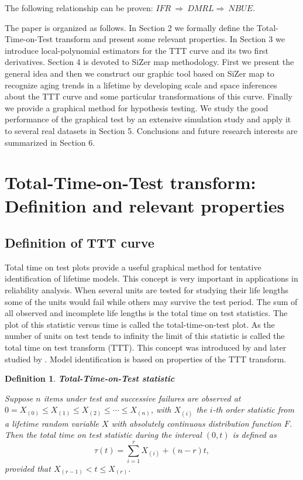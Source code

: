 \documentclass[preprint,12pt]{elsarticle}
\newtheorem{dfn}{{\sc Definition}}[section]
\begin{document}
The following relationship can be proven: $IFR \ \Rightarrow \ DMRL \Rightarrow \ NBUE$.


The paper is organized as follows. In Section 2 we formally define the Total-Time-on-Test transform and present some relevant properties. In Section 3 we introduce local-polynomial estimators for the TTT curve and its two first derivatives. Section 4 is devoted to SiZer map methodology. First we present the general idea and then we construct our graphic tool based on SiZer map to recognize aging trends in a lifetime by developing scale and space inferences about the TTT curve and some particular transformations of this curve. Finally we provide a graphical method for hypothesis testing. We study the good performance of the graphical test by an extensive simulation study and apply it to several real datasets in Section 5. Conclusions and future research interests are summarized in Section 6. 



\bigskip

\section{Total-Time-on-Test transform: Definition and relevant properties} \label{sec:TTT}

\subsection{Definition of TTT curve}\label{sec:TTTdef}

\noindent Total time on test plots provide a useful graphical method for tentative identification of lifetime models. This concept is very important in applications in reliability analysis. When several units are tested for studying their life lengths some of the units would fail while others may survive the test period. The sum of all observed and incomplete life lengths is the total time on test statistics. The plot of this statistic versus time is called the total-time-on-test plot. As the number of units on test tends to infinity the limit of this statistic is called the total time on test transform (TTT). This concept was introduced by \cite{BD72} and later studied by \cite{BP75}.
Model identification is based on properties of the TTT transform. 

\begin{dfn} \textbf{Total-Time-on-Test statistic} \label{ttt.def1}

\noindent Suppose $n$ items under test and successive failures are observed at $0=X_{(0)} \leq X_{(1)} \leq X_{(2)}\leq \cdots \leq X_{(n)}$, with $X_{(i)}$ the $i$-th order statistic from a lifetime random variable $X$ with absolutely continuous distribution function $F$. Then the \textit{total time on test statistic} during the interval $(0,t)$ is defined as 
\[
\tau (t) = \sum_{i=1}^r X_{(i)}+\left(n-r\right)t,
\]
provided that $X_{(r-1)}<t\leq X_{(r)}$.

\end{dfn}
\end{document}
